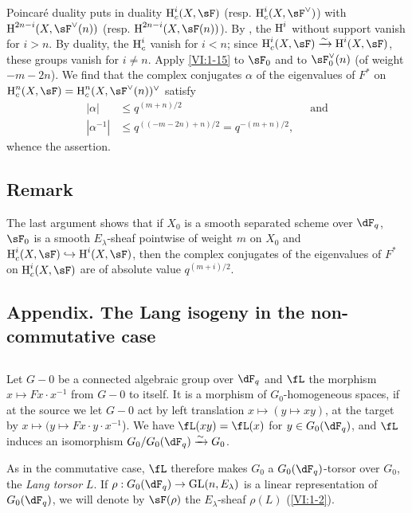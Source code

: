 Poincaré duality puts in duality $\h_c^i(X,\sF)$ (resp.
$\h_c^i(X,\sF^\vee)$) with $\h^{2n-i}(X,\sF^\vee(n))$ (resp.
$\h^{2n-i}(X,\sF(n))$). By \cite[XIV 3.2]{sga4}, the $\operatorname{H}^i$ without support
vanish for $i>n$. By duality, the $\operatorname{H}_c^i$ vanish for $i<n$; since
$\h_c^i(X,\sF) \iso \h^i(X,\sF)$, these groups vanish for $i\ne n$.
Apply \ref{VI:1-15} to $\sF_0$ and to $\sF_0^\vee(n)$ (of weight
$-m-2n$). We find that the complex conjugates $\alpha$ of the eigenvalues
of $F^\ast$ on $\h_c^n(X,\sF) = \h_c^n(X,\sF^\vee(n))^\vee$ satisfy 
\begin{align*}
  |\alpha| &\leqslant q^{(m+n)/2} && \text{and} \\
  |\alpha^{-1}| &\leqslant q^{((-m-2n)+n)/2} = q^{-(m+n)/2} \text{,}
\end{align*}
whence the assertion.




\subsection{Remark}\label{VI:1-21}

The last argument shows that if $X_0$ is a smooth separated scheme over
$\dF_q$, $\sF_0$ is a smooth $E_\lambda$-sheaf pointwise of weight
$m$ on $X_0$ and $\h_c^i(X,\sF) \hookrightarrow \h^i(X,\sF)$, then the
complex conjugates of the eigenvalues of $F^\ast$ on $\h_c^i(X,\sF)$ are
of absolute value $q^{(m+i)/2}$. 





\subsection*{Appendix. The Lang isogeny in the non-commutative case}




\subsection{}\label{VI:1-22}

Let $G-0$ be a connected algebraic group over $\dF_q$ and $\fL$ the morphism
$x\mapsto F x\cdot x^{-1}$ from $G-0$ to itself. It is a morphism of
$G_0$-homogeneous spaces, if at the source we let $G-0$ act by left
translation $x\mapsto (y\mapsto x y)$, at the target by
$x\mapsto (y\mapsto F x\cdot y\cdot x^{-1}$). We have $\fL(xy) = \fL(x)$ for
$y\in G_0(\dF_q)$, and $\fL$ induces an isomorphism $G_0/G_0(\dF_q)\iso G_0$.

As in the commutative case, $\fL$ therefore makes $G_0$ a $G_0(\dF_q)$-torsor
over $G_0$, the \emph{Lang torsor} $L$. If
$\rho:G_0(\dF_q) \to \gl(n,E_\lambda)$ is a linear representation of
$G_0(\dF_q)$, we will denote by $\sF(\rho)$ the $E_\lambda$-sheaf $\rho(L)$
(\ref{VI:1-2}). 





